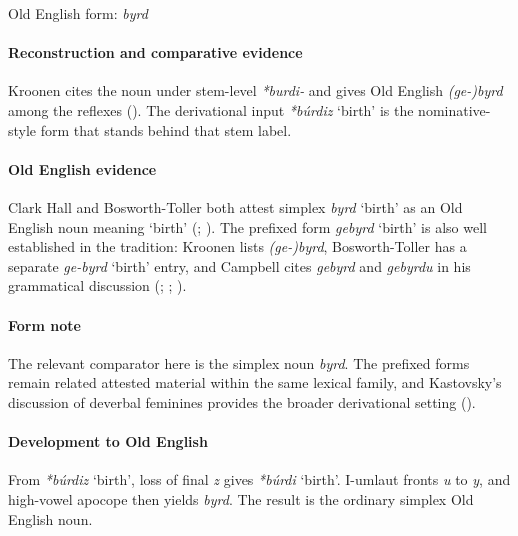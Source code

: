\documentclass[
  british,
  a4paper,
]{article}
\providecommand{\Recon}[1]{\emph{*#1}}
\begin{document}
Old English form: \emph{byrd}

\paragraph{Reconstruction and comparative
evidence}\label{reconstruction-and-comparative-evidence-5}

Kroonen cites the noun under stem-level \emph{*burdi-} and gives Old
English \emph{(ge-)byrd} among the reflexes
(). The derivational input
\Recon{búrdiz} `birth' is the nominative-style form that stands behind
that stem label.

\paragraph{Old English evidence}\label{old-english-evidence-5}

Clark Hall and Bosworth-Toller both attest simplex {\emph{byrd}} `birth'
as an Old English noun meaning `birth'
(;
). The
prefixed form \emph{gebyrd} `birth' is also well established in the
tradition: Kroonen lists \emph{(ge-)byrd}, Bosworth-Toller has a
separate \emph{ge-byrd} `birth' entry, and Campbell cites \emph{gebyrd}
and \emph{gebyrdu} in his grammatical discussion
(;
;
).

\paragraph{Form note}\label{form-note}

The relevant comparator here is the simplex noun \emph{byrd}. The
prefixed forms remain related attested material within the same lexical
family, and Kastovsky's discussion of deverbal feminines provides the
broader derivational setting ().

\paragraph{Development to Old
English}\label{development-to-old-english-5}

From \Recon{búrdiz} `birth', loss of final \emph{z} gives \Recon{búrdi}
`birth'. I-umlaut fronts \emph{u} to \emph{y}, and high-vowel apocope
then yields \emph{byrd}. The result is the ordinary simplex Old English
noun.
\end{document}
